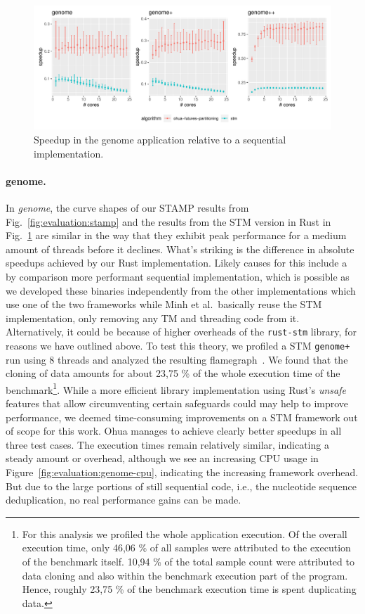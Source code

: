 \begin{figure}
    \centering
    \includegraphics[width=\textwidth,keepaspectratio]{gfx/results/genome_comb}
    \caption{Speedup in the genome application relative to a sequential implementation.}%
    \label{fig:evaluation:genome}
\end{figure}

\newpage

\paragraph{genome.} In \emph{genome}, the curve shapes of our STAMP results from Fig.~\ref{fig:evaluation:stamp} and the results from the STM version in Rust in Fig.~\ref{fig:evaluation:genome} are similar in the way that they exhibit peak performance for a medium amount of threads before it declines.
What's striking is the difference in absolute speedups achieved by our Rust implementation.
Likely causes for this include a by comparison more performant sequential implementation, which is possible as we developed these binaries independently from the other implementations which use one of the two frameworks while Minh et al.\ basically reuse the STM implementation, only removing any TM and threading code from it.
Alternatively, it could be because of higher overheads of the \texttt{rust-stm} library, for reasons we have outlined above.
To test this theory, we profiled a STM \texttt{genome+} run using 8 threads and analyzed the resulting flamegraph~\cite{gregg2016flame}.
We found that the cloning of data amounts for about 23,75 \% of the whole execution time of the benchmark\footnote{For this analysis we profiled the whole application execution. Of the overall execution time, only 46,06 \% of all samples were attributed to the execution of the benchmark itself. 10,94 \% of the total sample count were attributed to data cloning and also within the benchmark execution part of the program. Hence, roughly 23,75 \% of the benchmark execution time is spent duplicating data.}.
While a more efficient library implementation using Rust's \emph{unsafe} features that allow circumventing certain safeguards could may help to improve performance, we deemed time-consuming improvements on a STM framework out of scope for this work.
Ohua manages to achieve clearly better speedups in all three test cases.
The execution times remain relatively similar, indicating a steady amount or overhead, although we see an increasing CPU usage in Figure~\ref{fig:evaluation:genome-cpu}, indicating the increasing framework overhead.
But due to the large portions of still sequential code, i.e., the nucleotide sequence deduplication, no real performance gains can be made.

